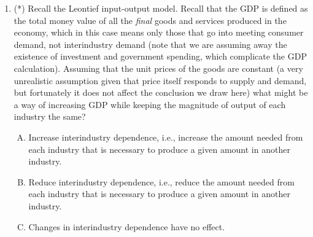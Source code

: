 \documentclass[10pt]{amsart}
\begin{document}
\begin{enumerate}
  {\em Answer}: Option (C)

  {\em Explanation}: Let $L$ be the linear function obtained and let
  $g = f - L$. $g$ is zero at both endpoints $a$ and $b$, below zero
  in between, and has its minimum at the midpoint. These
  characteristics strongly suggest that $g$ is a quadratic function
  with positive leading coefficient. Any quadratic function with
  positive leading coefficient that has zeros has its absolute minimum
  precisely at the midpoint between its zeros.

  Since $g$ is expected to be quadratic, $f = g + L$ is also expected to be
  quadratic.
  
  Note that we could try fitting using a polynomial of degree at most
  $3$. This, however, might run us into overfitting problems. As a
  general rule, we should try to fit using a function with as few
  parameters as possible and where the functional form is justified by
  broad theoretical considerations. If after fitting the quadratic, we
  discover some systemic errors that are best explained by a cubic
  type of discrepancy, we could then try a cubic.

  {\em Performance review}: 22 out of 29 got this. 3 each chose (B)
  and (D), 1 chose (A).

  {\em Historical note (last time)}: $25$ out of $29$ got this. $3$ chose (B),
  $1$ chose (D).
\item (*) Recall the Leontief input-output model. Recall that the GDP is
  defined as the total money value of all the {\em final} goods and
  services produced in the economy, which in this case means only
  those that go into meeting consumer demand, not interindustry demand
  (note that we are assuming away the existence of investment and
  government spending, which complicate the GDP calculation). Assuming
  that the unit prices of the goods are constant (a very unrealistic
  assumption given that price itself responds to supply and demand,
  but fortunately it does not affect the conclusion we draw here) what
  might be a way of increasing GDP while keeping the magnitude of
  output of each industry the same?

  \begin{enumerate}[(A)]
  \item Increase interindustry dependence, i.e., increase the amount
    needed from each industry that is necessary to produce a given
    amount in another industry.
  \item Reduce interindustry dependence, i.e., reduce the amount
    needed from each industry that is necessary to produce a given
    amount in another industry.
  \item Changes in interindustry dependence have no effect.
  \end{enumerate}


\end{enumerate}
\end{document}
